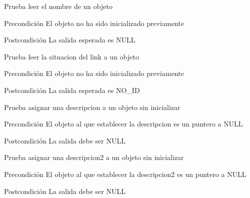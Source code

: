 \begin{DoxyRefList}
\item[\label{test__test000182}%
\hypertarget{test__test000182}{}%
Global \hyperlink{object__test_8c_a3710b8585155a414ad6b58d068c7db63}{test2\-\_\-object\-\_\-\-Get\-\_\-\-Name} ()]Prueba leer el nombre de un objeto \begin{DoxyPrecond}{Precondición}
El objeto no ha sido inicializado previamente 
\end{DoxyPrecond}
\begin{DoxyPostcond}{Postcondición}
La salida esperada es N\-U\-L\-L  
\end{DoxyPostcond}

\item[\label{test__test000198}%
\hypertarget{test__test000198}{}%
Global \hyperlink{object__test_8c_a40ab22a1a2998873748b9d58cb529b11}{test2\-\_\-object\-\_\-\-Get\-\_\-\-Open} ()]Prueba leer la situacion del link a un objeto \begin{DoxyPrecond}{Precondición}
El objeto no ha sido inicializado previamente 
\end{DoxyPrecond}
\begin{DoxyPostcond}{Postcondición}
La salida esperada es N\-O\-\_\-\-I\-D  
\end{DoxyPostcond}

\item[\label{test__test000166}%
\hypertarget{test__test000166}{}%
Global \hyperlink{object__test_8c_a65e32c3642c1d9207cdd84b134c616da}{test2\-\_\-object\-\_\-set\-\_\-description} ()]Prueba asignar una descripcion a un objeto sin inicializar \begin{DoxyPrecond}{Precondición}
El objeto al que establecer la descripcion es un puntero a N\-U\-L\-L 
\end{DoxyPrecond}
\begin{DoxyPostcond}{Postcondición}
La salida debe ser N\-U\-L\-L  
\end{DoxyPostcond}

\item[\label{test__test000168}%
\hypertarget{test__test000168}{}%
Global \hyperlink{object__test_8c_a52b9ccddf68cc2ee637dcfdac21206c9}{test2\-\_\-object\-\_\-set\-\_\-description2} ()]Prueba asignar una descripcion2 a un objeto sin inicializar \begin{DoxyPrecond}{Precondición}
El objeto al que establecer la descripcion2 es un puntero a N\-U\-L\-L 
\end{DoxyPrecond}
\begin{DoxyPostcond}{Postcondición}
La salida debe ser N\-U\-L\-L  
\end{DoxyPostcond}


\end{DoxyRefList}
